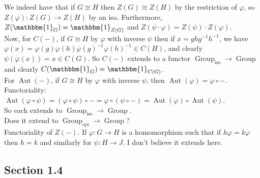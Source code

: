 \documentclass[a4paper]{article}
\theoremstyle{plain}%
\theoremstyle{definition}
\theoremstyle{remark}
\DeclareMathOperator{\Group}{Group}
\DeclareMathOperator{\Aut}{Aut}
\begin{document}
We indeed have that
if $G \cong H$ then $Z(G) \cong Z(H)$ by the restriction of $\varphi$, so
$Z(\varphi)  \colon Z(G) \to Z(H)$ by an iso. Furthermore,
$Z(\mathbbm{1}_G) = \mathbbm{1}_{Z(G)}$ and $Z(\psi \cdot \varphi) =
Z(\psi) \cdot Z(\varphi)$.\\
Now, for $C(-)$, if $G \cong H$ by $\varphi$ with inverse $\psi$ then
if $x = ghg^{-1}h^{-1}$, we have
$\varphi (x) =
\varphi (g) \varphi(h) \varphi(g)^{-1} \varphi(h)^{-1} \in C(H)$, and clearly
$\psi (\varphi(x)) = x \in C(G)$. So
$C(-)$ extends to a functor $\Group_{\text{iso}}\to  \Group$ and clearly
$C(\mathbbm{1}_G) = \mathbbm{1}_{C(G)}$.\\
For $\Aut(-)$, if $G \cong H$ by $\varphi$ with inverse $\psi$, then
$\Aut (\varphi) = \varphi \circ -$. 
Functoriality: $\Aut \left( \varphi \circ \psi \right) 
= \left( \varphi \circ \psi \right) \circ -
= \varphi \circ \left( \psi \circ - \right) 
= \Aut \left( \varphi \right) \circ \Aut \left( \psi \right) $.\\

So each extends to $\Group_{\text{iso}}\to \Group$.\\
\linebreak
Does it extend to $\Group_{\text{epi}}\to \Group$?\\
\linebreak
Functoriality of $Z(-)$. If $\varphi  \colon G \to H$ is a homomorphism such
that if $h \varphi = k \varphi$ then $h = k$ and similarly for $\psi
 \colon H \to J$. 
I don't believe it extends here.\\
\linebreak


\subsection*{Section 1.4}
\end{document}
